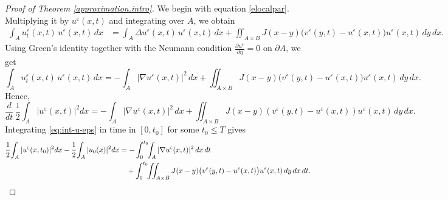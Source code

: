 \documentclass[reqno]{amsart}
\numberwithin{equation}{section}
\begin{document}
\begin{proof}[Proof of Theorem \ref{approximation.intro}]
We begin with equation \eqref{elocalpar}. Multiplying it by 
$u^\varepsilon(x,t)$ and integrating over $A$, we obtain
\begin{align*}
\int_A u_t^\varepsilon(x,t)\,u^\varepsilon(x,t)\,dx
&=
\int_A \Delta u^\varepsilon(x,t)\,u^\varepsilon(x,t)\,dx
  + \iint_{A\times B}
    J(x-y)\big( v^\varepsilon(y,t)-u^\varepsilon(x,t) \big)
    u^\varepsilon(x,t)\,dy\,dx.
\end{align*}
Using Green's identity together with the Neumann condition 
$\frac{\partial u^\varepsilon}{\partial \eta} =0$ on $\partial A$, we get
\[
\int_A u_t^\varepsilon(x,t)\,u^\varepsilon(x,t)\,dx
=
-\int_A |\nabla u^\varepsilon(x,t)|^2\,dx
+\iint_{A\times B}
  J(x-y)\big( v^\varepsilon(y,t)-u^\varepsilon(x,t) \big)
  u^\varepsilon(x,t)\,dy\,dx.
\]
Hence,
\begin{equation}\label{eq:int-u-eps}
\frac{d}{dt}\,\frac12\!\int_A |u^\varepsilon(x,t)|^2 dx
=
-\int_A |\nabla u^\varepsilon(x,t)|^2\,dx
+\iint_{A\times B} J(x-y)
   (v^\varepsilon(y,t)-u^\varepsilon(x,t))u^\varepsilon(x,t)\,dy\,dx.
\end{equation}
Integrating \eqref{eq:int-u-eps} in time in $[0,t_0]$ for some $t_0\leq T$ gives
\begin{align}\label{intelocalpar}
\frac12\!\int_A |u^\varepsilon(x,{t_0})|^2 dx
-\frac12\!\int_A |u_0(x)|^2 dx
&=
-\int_0^{t_0}\!\!\int_A |\nabla u^\varepsilon(x,t)|^2\,dx\,dt
\notag\\
&\quad
+\int_0^{t_0}\!\!\iint_{A\times B}
  J(x-y)\big( v^\varepsilon(y,t)-u^\varepsilon(x,t) \big)u^\varepsilon(x,t)
\,dy\,dx\,dt.
\end{align}


\end{proof}
\end{document}

